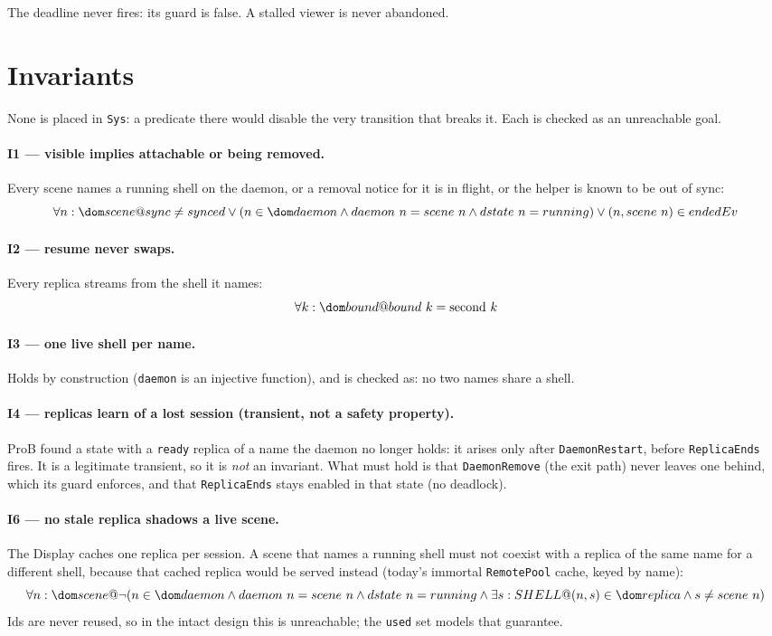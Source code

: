 \documentclass[a4paper,10pt,fleqn]{article}
\begin{document}
The deadline never fires: its guard is false.  A stalled viewer is never
abandoned.

\section{Invariants}
\label{sec:inv}

None is placed in \texttt{Sys}: a predicate there would disable the very
transition that breaks it.  Each is checked as an unreachable goal.

\paragraph{I1 --- visible implies attachable or being removed.}
Every scene names a running shell on the daemon, or a removal notice for
it is in flight, or the helper is known to be out of sync:
\[
  \forall n : \dom scene @ sync \neq synced \lor
    (n \in \dom daemon \land daemon~n = scene~n \land dstate~n = running)
    \lor (n , scene~n) \in endedEv
\]

\paragraph{I2 --- resume never swaps.}
Every replica streams from the shell it names:
\[
  \forall k : \dom bound @ bound~k = \mathrm{second}~k
\]

\paragraph{I3 --- one live shell per name.}
Holds by construction (\texttt{daemon} is an injective function), and is
checked as: no two names share a shell.

\paragraph{I4 --- replicas learn of a lost session (transient, not a safety property).}
ProB found a state with a \texttt{ready} replica of a name the daemon
no longer holds: it arises only after \texttt{DaemonRestart}, before
\texttt{ReplicaEnds} fires.  It is a legitimate transient, so it is
\emph{not} an invariant.  What must hold is that \texttt{DaemonRemove}
(the exit path) never leaves one behind, which its guard enforces, and
that \texttt{ReplicaEnds} stays enabled in that state (no deadlock).

\paragraph{I6 --- no stale replica shadows a live scene.}
The Display caches one replica per session.  A scene that names a running
shell must not coexist with a replica of the same name for a different
shell, because that cached replica would be served instead (today's
immortal \texttt{RemotePool} cache, keyed by name):
\[
  \forall n : \dom scene @ \lnot (n \in \dom daemon \land
    daemon~n = scene~n \land dstate~n = running \land
    \exists s : SHELL @ (n , s) \in \dom replica \land s \neq scene~n)
\]
Ids are never reused, so in the intact design this is unreachable; the
\texttt{used} set models that guarantee.
\end{document}
